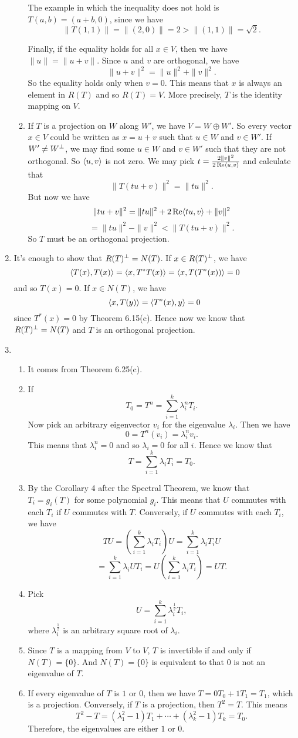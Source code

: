 \begin{enumerate}
\begin{enumerate}
The example in which the inequality does not hold is $T(a,b)=(a+b,0)$, since we have 
\[\|T(1,1)\|=\|(2,0)\|=2> \|(1,1)\|=\sqrt{2}.\]

Finally, if the equality holds for all $x\in V$, then we have $\|u\|=\|u+v\|$. Since $u$ and $v$ are orthogonal, we have 
\[\|u+v\|^2=\|u\|^2+\|v\|^2.\]
So the equality holds only when $v=0$. This means that $x$ is always an element in $R(T)$ and so $R(T)=V$. More precisely, $T$ is the identity mapping on $V$.
\item If $T$ is a projection on $W$ along $W'$, we have $V=W\oplus W'$. So every vector $x\in V$ could be written as $x=u+v$ such that $u\in W$ and $v\in W'$. If $W'\neq W^{\perp}$, we may find some $u\in W$ and $v\in W'$ such that they are not orthogonal. So $\langle u,v\rangle $ is not zero. We may pick $t=\frac{2\|v\|^2}{2 \operatorname{Re} \langle u,v\rangle}$ and calculate that 
\[\|T(tu+v)\|^2=\|tu\|^2.\]
But now we have 
\[\|tu+v\|^2=\|tu\|^2+2\operatorname{Re} \langle tu,v\rangle +\|v\|^2\]
\[=\|tu\|^2-\|v\|^2<\|T(tu+v)\|^2.\]
So $T$ must be an orthogonal projection.
\end{enumerate}
\item It's enough to show that $R(T)^{\perp}=N(T)$. If $x\in R(T)^{\perp}$, we have 
\[\langle T(x),T(x)\rangle =\langle x,T^*T(x)\rangle =\langle x,T(T^*(x))\rangle =0\]
and so $T(x)=0$. If $x\in N(T)$, we have 
\[\langle x,T(y)\rangle =\langle T^*(x),y\rangle =0\]
since $T^*(x)=0$ by Theorem 6.15(c). Hence now we know that $R(T)^{\perp}=N(T)$ and $T$ is an orthogonal projection.
\item \begin{enumerate}
\item It comes from Theorem 6.25(c).
\item If 
\[T_0=T^n=\sum_{i=1}^k{\lambda_i^nT_i}.\]
Now pick an arbitrary eigenvector $v_i$ for the eigenvalue $\lambda_i$. Then we have 
\[0 = T^n(v_i) = \lambda_i^nv_i.\] 
This means that $\lambda_i^n=0$ and so $\lambda_i=0$ for all $i$. Hence we know that 
\[T=\sum_{i=1}^k{\lambda_iT_i}=T_0.\]
\item By the Corollary 4 after the Spectral Theorem, we know that $T_i=g_i(T)$ for some polynomial $g_i$. This means that $U$ commutes with each $T_i$ if $U$ commutes with $T$. Conversely, if $U$ commutes with each $T_i$, we have 
\[TU=(\sum_{i=1}^k{\lambda_iT_i})U=\sum_{i=1}^k{\lambda_iT_iU}\]
\[=\sum_{i=1}^k{\lambda_iUT_i}=U(\sum_{i=1}^k{\lambda_iT_i})=UT.\]
\item Pick 
\[U=\sum_{i=1}^k{\lambda_i^{\frac{1}{2}}T_i},\]
where $\lambda_i^{\frac{1}{2}}$ is an arbitrary square root of $\lambda_i$.
\item Since $T$ is a mapping from $V$ to $V$, $T$ is invertible if and only if $N(T)=\{0\}$. And $N(T)=\{0\}$ is equivalent to that $0$ is not an eigenvalue of $T$.
\item If every eigenvalue of $T$ is $1$ or $0$, then we have $T=0T_0+1T_1=T_1$, which is a projection. Conversely, if $T$ is a projection, then $T^2 = T$.  This means 
\[
    T^2 - T = (\lambda_1^2 - 1)T_1 + \cdots + (\lambda_k^2 - 1)T_k = T_0.
\]
Therefore, the eigenvalues are either $1$ or $0$.  


\end{enumerate}
\end{enumerate}
